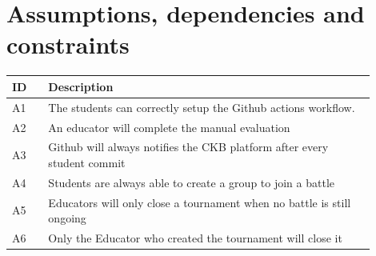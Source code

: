 \section{Assumptions, dependencies and constraints}
\begin{center}
    \begin{longtable}{ |l|p{0.9\linewidth}| }
        \hline
        \textbf{ID} & \textbf{Description}\\
        \hline
        A1 & The students can correctly setup the Github actions workflow. \\
        \hline
        A2 & An educator will complete the manual evaluation \\
        \hline
        A3 & Github will always notifies the CKB platform after every student commit \\
        \hline
        A4 & Students are always able to create a group to join a battle \\
        \hline
        A5 & Educators will only close a tournament when no battle is still ongoing\\
        \hline
        A6 & Only the Educator who created the tournament will close it\\
        \hline
    \end{longtable}
\end{center}